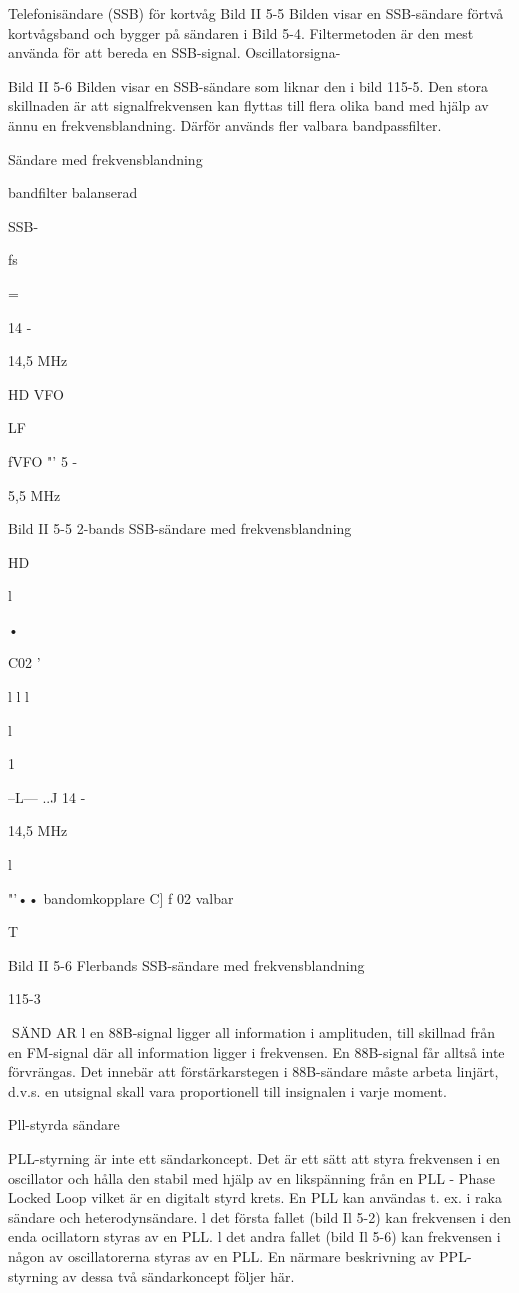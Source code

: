 \documentclass[a4paper,twoside,twocolumn,openright]{book}
\begin{document}
{{{Telefonisändare (SSB) för kortvåg
Bild II 5-5
Bilden visar en SSB-sändare förtvå kortvågsband och bygger på sändaren i Bild 5-4.
Filtermetoden är den mest använda för
att bereda en SSB-signal. Oscillatorsigna-

Bild II 5-6
Bilden visar en SSB-sändare som liknar den
i bild 115-5. Den stora skillnaden är att signalfrekvensen kan flyttas till flera olika band
med hjälp av ännu en frekvensblandning.
Därför används fler valbara bandpassfilter.

Sändare med frekvensblandning

bandfilter
balanserad

SSB-

fs

=

14 -

14,5 MHz

HD
VFO

LF

fVFO "' 5 -

5,5 MHz

Bild II 5-5 2-bands SSB-sändare med frekvensblandning

HD

l

•

C02
'

l
l
l

l

1

--L---  ..J
14 -

14,5 MHz

l

"'•• bandomkopplare
C] f
02 valbar

T

Bild II 5-6 Flerbands SSB-sändare med frekvensblandning

115-3

SÄND AR
l en 88B-signal ligger all information i
amplituden, till skillnad från en FM-signal
där all information ligger i frekvensen. En
88B-signal får alltså inte förvrängas. Det
innebär att förstärkarstegen i 88B-sändare
måste arbeta linjärt, d.v.s. en utsignal skall
vara proportionell till insignalen i varje moment.

Pll-styrda sändare

PLL-styrning är inte ett sändarkoncept. Det
är ett sätt att styra frekvensen i en oscillator
och hålla den stabil med hjälp av en likspänning från en PLL - Phase Locked Loop vilket är en digitalt styrd krets.
En PLL kan användas t. ex. i raka sändare och heterodynsändare. l det första fallet
(bild Il 5-2) kan frekvensen i den enda ocillatorn styras av en PLL. l det andra fallet
(bild Il 5-6) kan frekvensen i någon av oscillatorerna styras av en PLL.
En närmare beskrivning av PPL-styrning
av dessa två sändarkoncept följer här.

}}}
\end{document}
